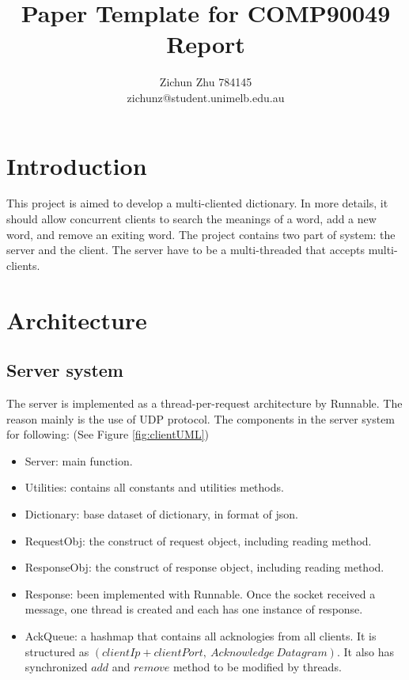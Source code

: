 \documentclass[11pt]{article}
\title{Paper Template for COMP90049 Report}
\author{Zichun Zhu 784145\\
	\large zichunz@student.unimelb.edu.au}
\begin{document}
\maketitle
\section{Introduction}
This project is aimed to develop a multi-cliented dictionary. In more details, it should allow concurrent clients to search the meanings of a word, add a new word, and remove an exiting word. The project contains two part of system: the server and the client. The server have to be a multi-threaded that accepts multi-clients.

\section{Architecture}
\subsection{Server system}
The server is implemented as a thread-per-request architecture by Runnable. The reason mainly is the use of UDP protocol. The components in the server system for following: (See Figure \ref{fig:clientUML})
\begin{itemize}
\item Server: main function.
\item Utilities: contains all constants and utilities methods.
\item Dictionary: base dataset of dictionary, in format of json.
\item RequestObj: the construct of request object, including reading method.
\item ResponseObj: the construct of response object, including reading method.
\item Response: been implemented with Runnable. Once the socket received a message, one thread is created and each has one instance of response.
\item AckQueue: a hashmap that contains all acknologies from all clients. It is structured as $(clientIp + clientPort,\ Acknowledge\ Datagram)$. It also has synchronized $add$ and $remove$ method to be modified by threads.
\end{itemize}
\end{document}
